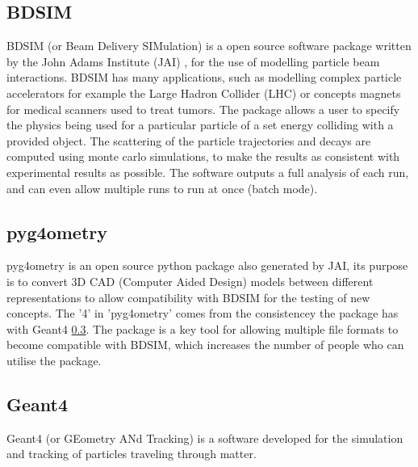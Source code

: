 \documentclass[12pt,a4paper]{article}
\begin{document}
\subsection{BDSIM}
\label{bdsim}
BDSIM (or Beam Delivery SIMulation) is a open source software package written by the John Adams Institute (JAI) \cite{jai}, for the use of modelling particle beam interactions. BDSIM has many applications, such as modelling complex particle accelerators for example the Large Hadron Collider (LHC) or concepts magnets for medical scanners used to treat tumors. The package allows a user to specify the physics being used for a particular particle of a set energy colliding with a provided object. The scattering of the particle trajectories and decays are computed using monte carlo simulations, to make the results as consistent with experimental results as possible. The software outputs a full analysis of each run, and can even allow multiple runs to run at once (batch mode).

\subsection{pyg4ometry}
\label{pyg}
pyg4ometry is an open source python package also generated by JAI, its purpose is to convert 3D CAD (Computer Aided Design) models between different representations to allow compatibility with BDSIM for the testing of new concepts. The '4' in 'pyg4ometry' comes from the consistencey the package has with Geant4 \ref{geant4}. The package is a key tool for allowing multiple file formats to become compatible with BDSIM, which increases the number of people who can utilise the package.

\subsection{Geant4}\label{geant4}
\label{g4}
Geant4 (or GEometry ANd Tracking) is a software developed for the simulation and tracking of particles traveling through matter.



\newpage
\end{document}
